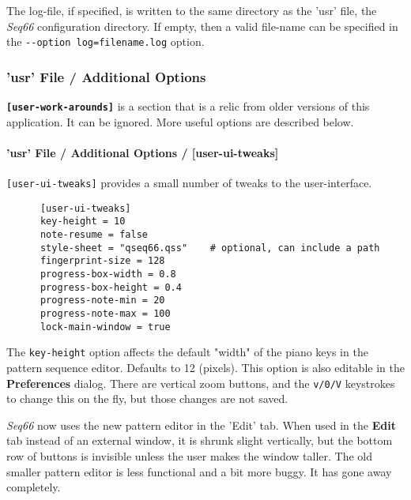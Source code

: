    The log-file, if specified, is written to the same directory as the 'usr'
   file, the \textsl{Seq66} configuration directory.
   If empty, then a valid file-name can be specified
   in the \texttt{-{}-option log=filename.log} option.

\subsubsection{'usr' File / Additional Options}
\label{subsubsec:usr_file_added_options}

   \textbf{\texttt{[user-work-arounds]}} is a section that is a relic from
   older versions of this application.  It can be ignored.  More useful options
   are described below.

\paragraph{'usr' File / Additional Options / [user-ui-tweaks]}
\label{paragraph:user_file_added_options_tweaks}

   \texttt{[user-ui-tweaks]} provides a small number of tweaks to the
   user-interface.

   \begin{verbatim}
      [user-ui-tweaks]
      key-height = 10
      note-resume = false
      style-sheet = "qseq66.qss"    # optional, can include a path
      fingerprint-size = 128
      progress-box-width = 0.8
      progress-box-height = 0.4
      progress-note-min = 20
      progress-note-max = 100
      lock-main-window = true
   \end{verbatim}

   The \texttt{key-height} option
   affects the default "width" of the piano keys in the pattern
   sequence editor.  Defaults to 12 (pixels).
   This option is also editable in the \textbf{Preferences} dialog.
   There are vertical zoom buttons, and the \texttt{v/0/V} keystrokes to change
   this on the fly, but those changes are not saved.

   \textsl{Seq66} now uses the new pattern editor in the 'Edit' tab.
   When used in the \textbf{Edit} tab instead of an external window,
   it is shrunk slight vertically, but the bottom row of buttons is invisible
   unless the user makes the window taller.
   The old smaller pattern editor is less functional and a bit more buggy.
   It has gone away completely.

